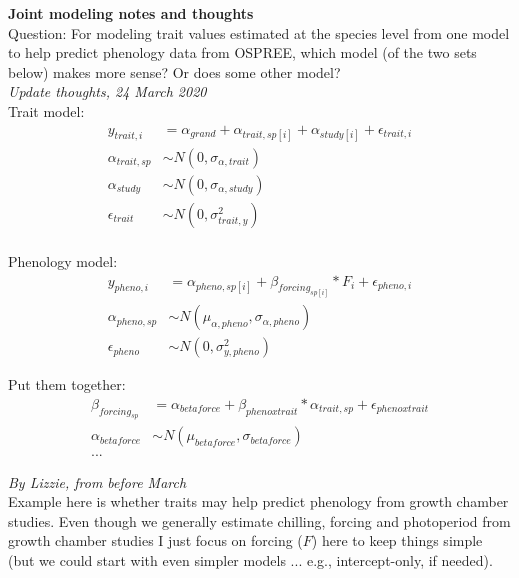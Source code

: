 \documentclass[11pt,letter]{article}
\begin{document}

\renewcommand{\refname}{\CHead{}}

{\bf Joint modeling notes and thoughts}\\


Question: For modeling trait values estimated at the species level from one model to help predict phenology data from OSPREE, which model (of the two sets below) makes more sense? Or does some other model?\\

\emph{Update thoughts, 24 March 2020}\\

Trait model:
\begin{align*}
y_{trait, i} &= \alpha_{grand} + \alpha_{trait, sp[i]} + \alpha_{study[i]} + \epsilon_{trait, i}\\
\alpha_{trait, sp} & \sim N(0, \sigma_{\alpha, trait}) \\
\alpha_{study}  & \sim N(0, \sigma_{\alpha, study})\\
\epsilon_{trait} & \sim N(0,\sigma^2_{trait, y}) \\
\end{align*}

Phenology model:
\begin{align*}
y_{pheno, i} &= \alpha_{pheno, sp[i]} + \beta_{forcing_{sp[i]}}*F_i+ \epsilon_{pheno, i}\\
\alpha_{pheno, sp} & \sim N(\mu_{\alpha, pheno}, \sigma_{\alpha, pheno}) \\
\epsilon_{pheno} & \sim N(0,\sigma^2_{y, pheno}) 
\end{align*}

Put them together:
\begin{align*}
\beta_{forcing_{sp}} &= \alpha_{betaforce} + \beta_{pheno x trait}*\alpha_{trait, sp} + \epsilon_{pheno x trait}\\
\alpha_{betaforce} & \sim N(\mu_{betaforce}, \sigma_{betaforce})\\
...
\end{align*}


\emph{By Lizzie, from before March}\\

Example here is whether traits may help predict phenology from growth chamber studies. Even though we generally estimate chilling, forcing and photoperiod from growth chamber studies I just focus on forcing ($F$) here to keep things simple (but we could start with even simpler models ... e.g., intercept-only, if needed).\\
\end{document}
